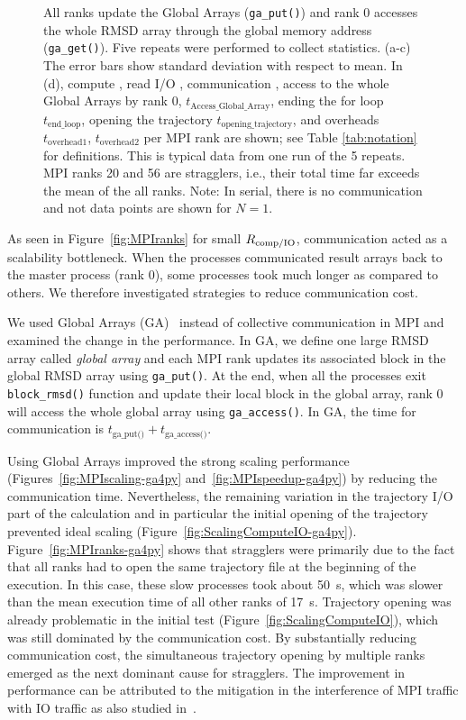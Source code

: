 \begin{figure}[!htb]
{    All ranks update the Global Arrays (\texttt{ga\_put()}) and rank 0 accesses the whole RMSD array through the global memory address (\texttt{ga\_get()}).
    Five repeats were performed to collect statistics. (a-c) The error bars show standard deviation with respect to mean. 
    In (d), compute \tcomp, read I/O \tIO, communication \tcomm, access to the whole Global Arrays by rank 0, $t_{\text{Access\_Global\_Array}}$, ending the for loop $t_{\text{end\_loop}}$,
    opening the trajectory $t_{\text{opening\_trajectory}}$, and overheads $t_{\text{overhead1}}$, $t_{\text{overhead2}}$ per MPI rank are shown; see Table \ref{tab:notation} for definitions. 
    This is typical data from one run of the 5 repeats.
    MPI ranks 20 and 56 are stragglers, i.e., their total time far exceeds the mean of the all ranks.
    Note: In serial, there is no communication and not data points are shown for $N=1$.}
\label{fig:MPIwithIO-ga4py}
\end{figure}


As seen in Figure~\ref{fig:MPIranks} for small $R_{\text{comp/IO}}$, communication acted as a scalability bottleneck. 
When the processes communicated result arrays back to the master process (rank 0), some processes took much longer as compared to others.
We therefore investigated strategies to reduce communication cost. 

We used Global Arrays (GA)~\cite{GA, GAiN} instead of collective communication in MPI and examined the change in the performance. 
In GA, we define one large RMSD array called \emph{global array} and each MPI rank updates its associated block in the global RMSD array using \texttt{ga\_put()}. 
At the end, when all the processes exit \texttt{block\_rmsd()} function and update their local block in the global array, rank 0 will access the whole global array using \texttt{ga\_access()}.
In GA, the time for communication is $t_{\text{ga\_put()}}+t_{\text{ga\_access()}}$. 

Using Global Arrays improved the strong scaling performance (Figures~\ref{fig:MPIscaling-ga4py} and~\ref{fig:MPIspeedup-ga4py}) by reducing the communication time.
Nevertheless, the remaining variation in the trajectory I/O part of the calculation and in particular the initial opening of the trajectory prevented ideal scaling (Figure~\ref{fig:ScalingComputeIO-ga4py}).
Figure~\ref{fig:MPIranks-ga4py} shows that stragglers were primarily due to the fact that all ranks had to open the same trajectory file at the beginning of the execution.
In this case, these slow processes took about 50~s, which was slower than the mean execution time of all other ranks of 17~s. 
Trajectory opening was already problematic in the initial test (Figure~\ref{fig:ScalingComputeIO}), which was still dominated by the communication cost. By substantially reducing communication cost, the simultaneous trajectory opening by multiple ranks emerged as the next dominant cause for stragglers.
The improvement in performance can be attributed to the mitigation in the interference of MPI traffic with IO traffic as also studied in~\cite{Brown:2018ab}.

